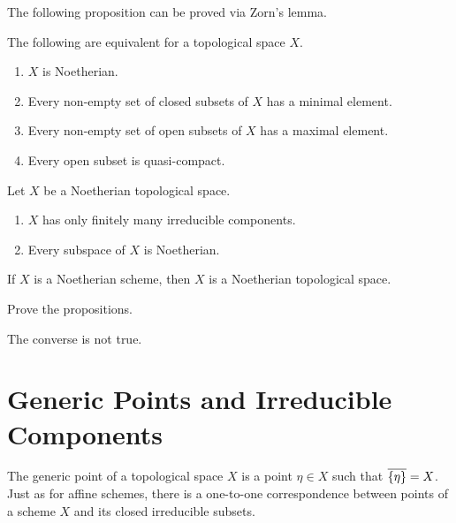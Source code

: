 \documentclass[12pt]{book}
\theoremstyle{definition}
\DeclarePairedDelimiter{\Set}{\lbrace}{\rbrace}
\begin{document}
	The following proposition can be proved via Zorn's lemma.
	
	\begin{proposition}
		The following are equivalent for a topological space $X$.
		\begin{enumerate}
			\item $X$ is Noetherian.
			\item Every non-empty set of closed subsets of $X$ has a minimal element.
			
			\item Every non-empty set of open subsets of $X$ has a maximal element.
			
			\item Every open subset is quasi-compact.
		\end{enumerate}
	\end{proposition}
	
	\begin{proposition}
		Let $X$ be a Noetherian topological space.
		\begin{enumerate}
			\item $X$ has only finitely many irreducible components.
			\item Every subspace of $X$ is Noetherian.
		\end{enumerate}
	\end{proposition}
	
	
	
	\begin{proposition}
		If $X$ is a Noetherian scheme, then $X$ is a Noetherian topological space.
	\end{proposition}
	
	\begin{exercise}
		Prove the propositions.
	\end{exercise}
	
	\begin{remark}
		The converse is not true.
	\end{remark}
	
	
	\section{Generic Points and Irreducible Components}
	
	The generic point of a topological space $X$ is a point $\eta \in X$ such that $\overline{\Set{\eta}} = X$. Just as for affine schemes, there is a one-to-one correspondence between points of a scheme $X$ and its closed irreducible subsets.
	
\end{document}
